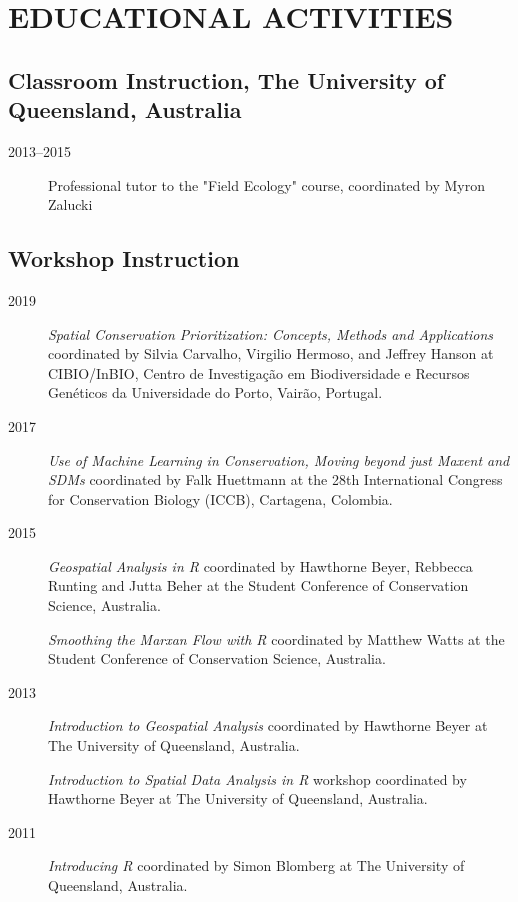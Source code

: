 \documentclass[12pt,a4paper]{article}
\begin{document}
\section*{EDUCATIONAL ACTIVITIES}

\subsection*{Classroom Instruction, The University of Queensland, Australia}

\begin{description}

\item[2013--2015] Professional tutor to the "Field Ecology" course, coordinated by Myron Zalucki

\end{description}

\subsection*{Workshop Instruction}

\begin{description}

\item[2019] \textit{Spatial Conservation Prioritization: Concepts, Methods and Applications} coordinated by Silvia Carvalho, Virgilio Hermoso, and Jeffrey Hanson at CIBIO/InBIO, Centro de Investigação em Biodiversidade e Recursos Genéticos da Universidade do Porto, Vairão, Portugal.

\item[2017] \textit{Use of Machine Learning in Conservation, Moving beyond just Maxent and SDMs} coordinated by Falk Huettmann at the 28th International Congress for Conservation Biology (ICCB), Cartagena, Colombia.

\item[2015] \textit{Geospatial Analysis in R} coordinated by Hawthorne Beyer, Rebbecca Runting and Jutta Beher at the Student Conference of Conservation Science, Australia.

\item[] \textit{Smoothing the Marxan Flow with R} coordinated by Matthew Watts at the Student Conference of Conservation Science, Australia.

\item[2013] \textit{Introduction to Geospatial Analysis} coordinated by Hawthorne Beyer at The University of Queensland, Australia.

\item[] \textit{Introduction to Spatial Data Analysis in R} workshop coordinated by Hawthorne Beyer at The University of Queensland, Australia.

\item[2011] \textit{Introducing R} coordinated by Simon Blomberg at The University of Queensland, Australia.

\end{description}
\end{document}
